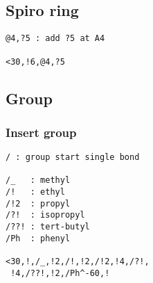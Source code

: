 \documentclass[a4paper]{article}
\begin{document}
\subsection{Spiro ring}
\begin{verbatim}
@4,?5 : add ?5 at A4

<30,!6,@4,?5
\end{verbatim}
\subsection{Group}
\subsubsection{Insert group}
\index{/}%
%
\begin{verbatim}
/ : group start single bond

/_   : methyl
/!   : ethyl
/!2  : propyl
/?!  : isopropyl
/??! : tert-butyl
/Ph  : phenyl

<30,!,/_,!2,/!,!2,/!2,!4,/?!,
 !4,/??!,!2,/Ph^-60,!
\end{verbatim}
\end{document}
